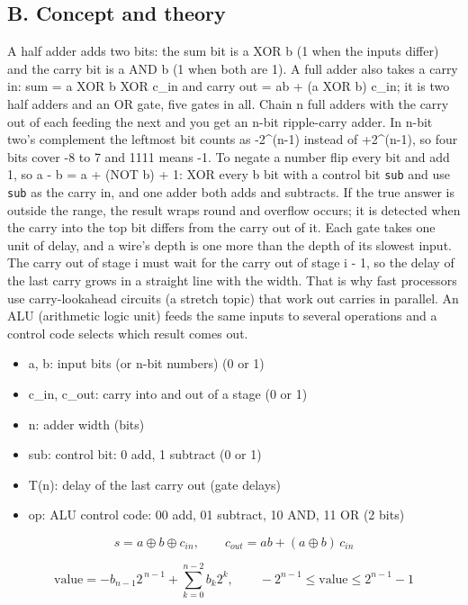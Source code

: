 \documentclass[11pt,a4paper]{article}
\begin{document}
\subsection*{B. Concept and theory}
A half adder adds two bits: the sum bit is a XOR b (1 when the inputs differ) and the carry bit is a AND b (1 when both are 1). A full adder also takes a carry in: sum = a XOR b XOR c\_in and carry out = ab + (a XOR b) c\_in; it is two half adders and an OR gate, five gates in all. Chain n full adders with the carry out of each feeding the next and you get an n-bit ripple-carry adder. In n-bit two's complement the leftmost bit counts as -2\textasciicircum{}(n-1) instead of +2\textasciicircum{}(n-1), so four bits cover -8 to 7 and 1111 means -1. To negate a number flip every bit and add 1, so a - b = a + (NOT b) + 1: XOR every b bit with a control bit \texttt{sub} and use \texttt{sub} as the carry in, and one adder both adds and subtracts. If the true answer is outside the range, the result wraps round and overflow occurs; it is detected when the carry into the top bit differs from the carry out of it. Each gate takes one unit of delay, and a wire's depth is one more than the depth of its slowest input. The carry out of stage i must wait for the carry out of stage i - 1, so the delay of the last carry grows in a straight line with the width. That is why fast processors use carry-lookahead circuits (a stretch topic) that work out carries in parallel. An ALU (arithmetic logic unit) feeds the same inputs to several operations and a control code selects which result comes out.

\begin{itemize}[nosep]
\item a, b: input bits (or n-bit numbers) (0 or 1)
\item c\_in, c\_out: carry into and out of a stage (0 or 1)
\item n: adder width (bits)
\item sub: control bit: 0 add, 1 subtract (0 or 1)
\item T(n): delay of the last carry out (gate delays)
\item op: ALU control code: 00 add, 01 subtract, 10 AND, 11 OR (2 bits)
\end{itemize}

\begin{equation*}
s=a\oplus b\oplus c_{in},\qquad c_{out}=ab+(a\oplus b)\,c_{in}
\end{equation*}

\begin{equation*}
\text{value}=-b_{n-1}2^{\,n-1}+\sum_{k=0}^{n-2}b_k 2^{k},\qquad -2^{n-1}\le \text{value}\le 2^{n-1}-1
\end{equation*}
\end{document}
